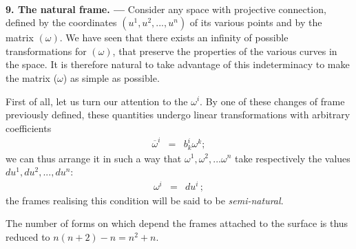 
\ \\

{\bf 9. The natural frame. --- }
% 
Consider any space with projective connection, defined by the  coordinates $(u^1, u^2, ..., u^n)$ of its various points and by the matrix $(\omega)$. We have seen that there exists an infinity of possible transformations for $(\omega)$, that preserve the properties of the various curves in the space. It is therefore natural to take advantage of this indeterminacy to make the matrix ($\omega$) as simple as possible.

First of all, let us turn our attention to the $\omega^i$. By one of these changes of frame previously defined, these quantities undergo linear transformations with arbitrary coefficients
\begin{eqnarray*}
\overline \omega^i &=& b^i_k \omega^k ;
\end{eqnarray*}
we can thus arrange it in such a way that $\omega^1, \omega^2, ...\omega^n$ take respectively the values $du^1, du^2, ..., du^n$:
\begin{eqnarray*}
 \omega^i &=& du^i\, ;
\end{eqnarray*}
the frames realising this condition will be said to be {\em semi-natural}.

The number of forms on which depend the frames attached to the surface is thus reduced to $n (n + 2) - n = n^2 + n$.


